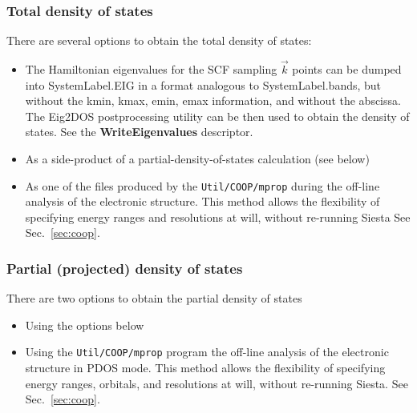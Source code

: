 \documentclass[11pt]{article}
\begin{document}
\subsubsection{Total density of states}
There are several options to obtain the
total density of states:
\begin{itemize}
\item The Hamiltonian eigenvalues for the SCF sampling $\vec k$ points can be
dumped into SystemLabel.EIG in a format analogous to SystemLabel.bands,
but without the kmin, kmax, emin, emax information, and without
the abscissa. The {\sc Eig2DOS}
postprocessing utility can be then used to obtain the density of
states.
See the {\bf WriteEigenvalues} descriptor.
%
\item As a side-product of a partial-density-of-states calculation
  (see below)
\item As one of the files produced by the {\tt Util/COOP/mprop} during
  the off-line analysis of the electronic structure. This method
  allows the flexibility of specifying energy ranges and resolutions
  at will, without re-running {\sc Siesta} See Sec.~\ref{sec:coop}.
\end{itemize}

\subsubsection{Partial (projected) density of states}

There are two options to obtain the partial density of states
\begin{itemize}
\item Using the options below
\item Using the {\tt Util/COOP/mprop} program the off-line analysis of
  the electronic structure in PDOS mode. This method allows the
  flexibility of specifying energy ranges, orbitals, and resolutions
  at will, without re-running {\sc Siesta}. See Sec.~\ref{sec:coop}.
\end{itemize}
\end{document}
